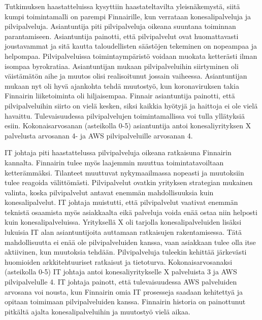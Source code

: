 Tutkimuksen haastatteluissa kysyttiin haastateltavilta yleisnäkemystä, siitä kumpi toimintamalli on parempi Finnairille, kun verrataan konesalipalveluja ja pilvipalveluja. Asiantuntija piti pilvipalveluja oikeana suuntana toiminnan parantamiseen. Asiantuntija painotti, että pilvipalvelut ovat huomattavasti joustavammat ja sitä kautta taloudellisten säästöjen tekeminen on nopeampaa ja helpompaa. Pilvipalveluissa toimintaympäristö voidaan muokata ketterästi ilman isompaa byrokratiaa. Asiantuntijan mukaan pilvipalveluihin siirtyminen oli väistämätön aihe ja muutos olisi realisoitunut jossain vaiheessa. Asiantuntijan mukaan nyt oli hyvä ajankohta tehdä muutostyö, kun koronaviruksen takia Finnairin liiketoiminta oli hiljaisempaa. Finnair asiantuntija painotti, että pilvipalveluihin siirto on vielä kesken, siksi kaikkia hyötyjä ja haittoja ei ole vielä havaittu. Tulevaisuudessa pilvipalvelujen toimintamallissa voi tulla yllätyksiä esiin. Kokonaisarvosanan (asteikolla 0-5) asiantuntija antoi konesaliyrityksen X palvelusta arvosanan 4- ja AWS pilvipalveluille arvosanan 4.

IT johtaja piti haastattelussa pilvipalveluja oikeana ratkaisuna Finnairin kannalta. Finnairin tulee myös laajemmin muuttua toimintatavoiltaan ketterämmäksi. Tilanteet muuttuvat nykymaailmassa nopeasti ja muutoksiin tulee reagoida välittömästi. Pilvipalvelut ovatkin yrityksen strategian mukainen valinta, koska pilvipalvelut antavat enemmän mahdollisuuksia kuin konesalipalvelut. IT johtaja muistutti, että pilvipalvelut vaativat enemmän teknistä osaamista myös asiakkaalta eikä palveluja voida enää ostaa niin helposti kuin konesalipalveluissa. Yrityksellä X oli tarjolla konesalipalveluiden lisäksi lukuisia IT alan asiantuntijoita auttamaan ratkaisujen rakentamisessa. Tätä mahdollisuutta ei enää ole pilvipalveluiden kanssa, vaan asiakkaan tulee olla itse aktiivinen, kun muutoksia tehdään. Pilvipalveluja tuleekin kehittää järkevästi huomioiden arkkitehtuuriset ratkaisut ja tietoturva. Kokonaisarvosanaksi (asteikolla 0-5) IT johtaja antoi konesaliyritykselle X palveluista 3 ja AWS pilvipalvelulle 4. IT johtaja painott, että tulevaisuudessa AWS palveluiden arvosana voi nousta, kun Finnairin omia IT prosesseja saadaan kehitettyä ja opitaan toimimaan pilvipalveluiden kanssa. Finnairin historia on painottunut pitkältä ajalta konesalipalveluihin ja muutostyö vielä aikaa.